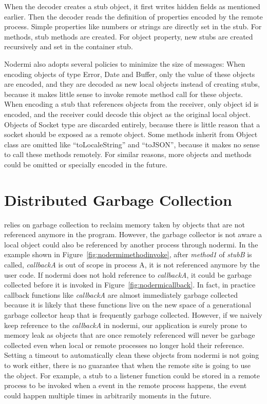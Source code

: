 When the decoder creates a stub object, it first writes hidden fields as mentioned
earlier. Then the decoder reads the definition of properties encoded by the remote
process.
Simple properties like numbers or strings are directly set in the stub.
For methods, stub methods are created. For object property,
new stubs are created recursively and set in the container stub.

Nodermi also adopts several policies to minimize the size of messages:
When encoding objects of type Error, Date and Buffer,
only the value of these objects are encoded,
and they are decoded as new local objects instead of creating stubs,
because it makes little sense to invoke remote method call for these objects.
When encoding a stub that references objects from the receiver,
only object id is encoded,
and the receiver could decode this object as the original local object.
Objects of Socket type are discarded entirely, because
there is little reason that a socket should be exposed as a remote object.
Some methods inherit from Object class are omitted like ``toLocaleString''
and ``toJSON'', because it makes no sense to call these methods remotely.
For similar reasons, more objects and methods could be omitted or specially encoded
in the future.


\section{Distributed Garbage Collection}
\js{} relies on garbage collection to reclaim memory taken by
objects that are not referenced anymore in the program.
However, the garbage collector is not aware a local object
could also be referenced by another process through nodermi.
In the example shown in Figure~\ref{fig:nodermimethodinvoke},
after \emph{method1} of \emph{stubB} is called,
\emph{callbackA} is out of scope in process A,
it is not referenced anymore by the user code.
If nodermi does not hold reference to \emph{callbackA},
it could be garbage collected before it is invoked in Figure~\ref{fig:nodermicallback}.
In fact, in practice callback functions like \emph{callbackA} are almost
immediately garbage collected because it is likely that these functions
live on the new space of a generational garbage collector heap that is frequently
garbage collected.
However, if we naively keep reference to the \emph{callbackA} in nodermi,
our application is surely prone to memory leak as objects that are once remotely
referenced
will never be garbage collected even when local or remote processes no longer hold their reference.
Setting a timeout to automatically clean these objects from nodermi
 is not going to work either,
there is no guarantee that when the remote site is going to use the object.
For example,
a stub to a listener function could be stored in a remote process
to be invoked when a event in the remote process happens,
the event could happen multiple times in arbitrarily moments in the future.

